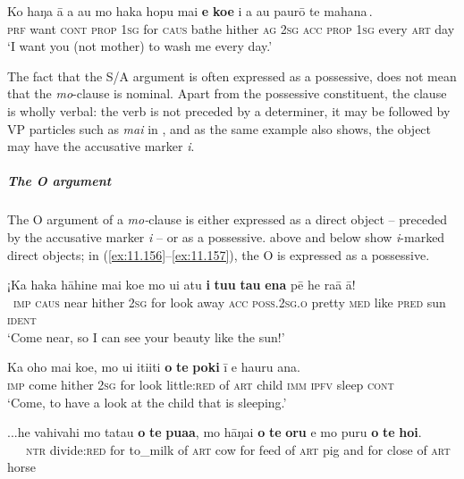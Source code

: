 \ea\label{ex:11.154}
\gll Ko haŋa {\ꞌ}ā a au {\ob}mo haka hopu mai \textbf{e} \textbf{koe} i a au  paurō te mahana\,{\cb}.\\
\textsc{prf} want \textsc{cont} \textsc{prop} \textsc{1sg} {\db}for \textsc{caus} bathe hither \textsc{ag} \textsc{2sg} \textsc{acc} \textsc{prop} \textsc{1sg}  every \textsc{art} day\\

\glt
‘I want you (not mother) to wash me every day.’ \textstyleExampleref{[R313.178]} 
\z

The fact that the S/A argument is often expressed as a possessive, does not mean that the \textit{mo}{}-clause is nominal. Apart from the possessive constituent, the clause is wholly verbal: the verb is not preceded by a determiner, it may be followed by VP particles such as \textit{mai} in , and as the same example also shows, the object may have the accusative marker \textit{i}.

\subparagraph{The O argument} The O argument of a \textit{mo-}clause is either expressed as a direct object – preceded by the accusative marker \textit{i} – or as a possessive.  above and  below show \textit{i}{}-marked direct objects; in (\ref{ex:11.156}–\ref{ex:11.157}), the O is expressed as a possessive.

\ea\label{ex:11.155}
\gll ¡Ka haka hāhine mai koe mo u{\ꞌ}i atu \textbf{i} \textbf{tu{\ꞌ}u} \textbf{tau} \textbf{ena}  pē he ra{\ꞌ}ā {\ꞌ}ā!\\
~\textsc{imp} \textsc{caus} near hither \textsc{2sg} for look away \textsc{acc} \textsc{poss.2sg.o} pretty \textsc{med}  like \textsc{pred} sun \textsc{ident}\\

\glt 
‘Come near, so I can see your beauty like the sun!’ \textstyleExampleref{[R301.212]} 
\z

\ea\label{ex:11.156}
\gll Ka oho mai koe, mo u{\ꞌ}i {\ꞌ}iti{\ꞌ}iti \textbf{o} \textbf{te} \textbf{poki} {\ꞌ}ī e ha{\ꞌ}uru {\ꞌ}ana. \\
\textsc{imp} come hither \textsc{2sg} for look little:\textsc{red} of \textsc{art} child \textsc{imm} \textsc{ipfv} sleep \textsc{cont} \\

\glt 
‘Come, to have a look at the child that is sleeping.’ \textstyleExampleref{[R235.047]} 
\z

\ea\label{ex:11.157}
\gll ...he vahivahi mo tatau \textbf{o} \textbf{te} \textbf{pua{\ꞌ}a}, mo hāŋai \textbf{o} \textbf{te} \textbf{oru} {\ꞌ}e mo puru \textbf{o} \textbf{te} \textbf{hoi}.\\
~~~\textsc{ntr} divide:\textsc{red} for to\_milk of \textsc{art} cow for feed of \textsc{art} pig and for close of \textsc{art} horse\\

